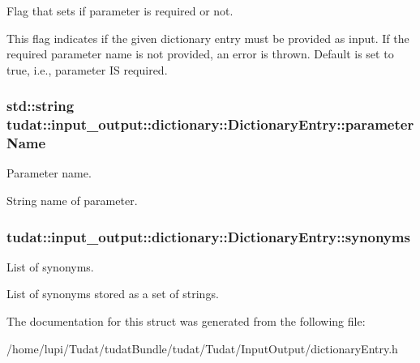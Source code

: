 Flag that sets if parameter is required or not. 

This flag indicates if the given dictionary entry must be provided as input. If the required parameter name is not provided, an error is thrown. Default is set to true, i.\+e., parameter IS required. 
\subsubsection[{\texorpdfstring{parameter\+Name}{parameterName}}]{\setlength{\rightskip}{0pt plus 5cm}std\+::string tudat\+::input\+\_\+output\+::dictionary\+::\+Dictionary\+Entry\+::parameter\+Name}\hypertarget{structtudat_1_1input__output_1_1dictionary_1_1DictionaryEntry_a81719f201bc0dc391e5ef36ce4e950ea}{}\label{structtudat_1_1input__output_1_1dictionary_1_1DictionaryEntry_a81719f201bc0dc391e5ef36ce4e950ea}


Parameter name. 

String name of parameter. 
\subsubsection[{\texorpdfstring{synonyms}{synonyms}}]{ tudat\+::input\+\_\+output\+::dictionary\+::\+Dictionary\+Entry\+::synonyms}\hypertarget{structtudat_1_1input__output_1_1dictionary_1_1DictionaryEntry_aabc54d115c5728ad6c88fbf95e973430}{}\label{structtudat_1_1input__output_1_1dictionary_1_1DictionaryEntry_aabc54d115c5728ad6c88fbf95e973430}


List of synonyms. 

List of synonyms stored as a set of strings. 

The documentation for this struct was generated from the following file\+:\begin{DoxyCompactItemize}
\item 
/home/lupi/\+Tudat/tudat\+Bundle/tudat/\+Tudat/\+Input\+Output/dictionary\+Entry.\+h\end{DoxyCompactItemize}
